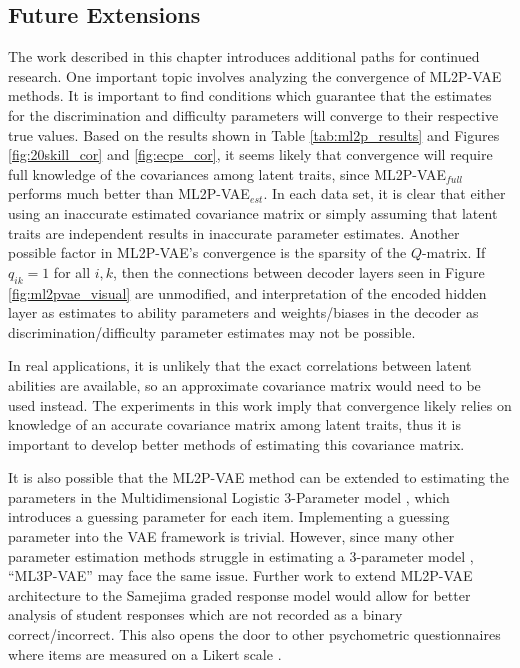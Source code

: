 \subsection{Future Extensions}\label{sec:ml2pvae_future}
The work described in this chapter introduces additional paths for continued research. One important topic involves analyzing the convergence of ML2P-VAE methods. It is important to find conditions which guarantee that the estimates for the discrimination and difficulty parameters will converge to their respective true values. Based on the results shown in Table \ref{tab:ml2p_results} and Figures \ref{fig:20skill_cor} and \ref{fig:ecpe_cor}, it seems likely that convergence will require full knowledge of the covariances among latent traits, since ML2P-VAE$_{full}$ performs much better than ML2P-VAE$_{est}$. In each data set, it is clear that either using an inaccurate estimated covariance matrix or simply assuming that latent traits are independent results in inaccurate parameter estimates. Another possible factor in ML2P-VAE's convergence is the sparsity of the $Q$-matrix. If $q_{ik} = 1$ for all $i,k$, then the connections between decoder layers seen in Figure \ref{fig:ml2pvae_visual} are unmodified, and interpretation of the encoded hidden layer as estimates to ability parameters and weights/biases in the decoder as discrimination/difficulty parameter estimates may not be possible.

In real applications, it is unlikely that the exact correlations between latent abilities are available, so an approximate covariance matrix would need to be used instead. The experiments in this work imply that convergence likely relies on knowledge of an accurate covariance matrix among latent traits, thus it is important to develop better methods of estimating this covariance matrix.

It is also possible that the ML2P-VAE method can be extended to estimating the parameters in the Multidimensional Logistic 3-Parameter model \cite{birnbaum1968}, which introduces a guessing parameter for each item. Implementing a guessing parameter into the VAE framework is trivial. However, since many other parameter estimation methods struggle in estimating a 3-parameter model \cite{baker_kim2004}, ``ML3P-VAE'' may face the same issue. Further work to extend ML2P-VAE architecture to the Samejima graded response model \cite{samejima1997} would allow for better analysis of student responses which are not recorded as a binary correct/incorrect. This also opens the door to other psychometric questionnaires where items are measured on a Likert scale \cite{likert1932}.

